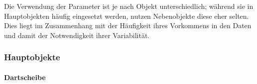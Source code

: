 \begin{center}
    \label{fig:age}
\end{center}

Die Verwendung der Parameter ist je nach Objekt unterschiedlich; während sie in Hauptobjekten häufig eingesetzt werden, nutzen Nebenobjekte diese eher selten. Dies liegt im Zusammenhang mit der Häufigkeit ihres Vorkommens in den Daten und damit der Notwendigkeit ihrer Variabilität.


\subsubsection{Hauptobjekte}
\label{sec:impl:daten:blender:hauptobjekte}


\paragraph{Dartscheibe}
\label{sec:impl:daten:blender:hauptobjekte:dartscheibe}


